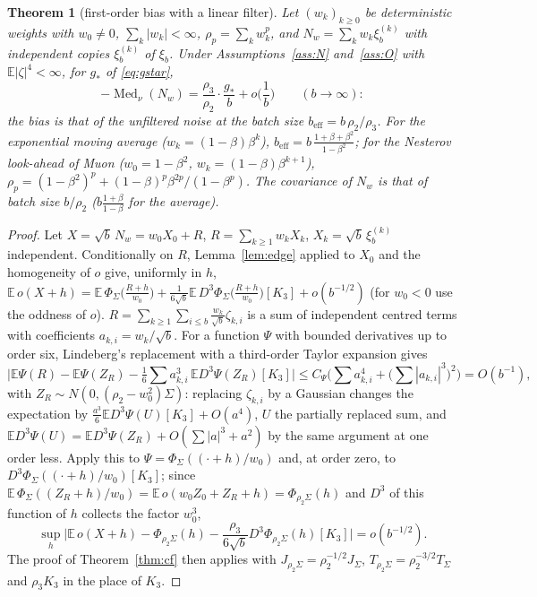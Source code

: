 \documentclass[10pt]{article}
\newtheorem{theorem}{Theorem}
\theoremstyle{definition}
\theoremstyle{remark}
\newcommand{\E}{\mathbb{E}}
\newcommand{\Med}{\operatorname{Med}}
\begin{document}
\begin{theorem}[first-order bias with a linear filter]\label{thm:mombias}
Let $(w_k)_{k\ge0}$ be deterministic weights with $w_0\ne0$, $\sum_k|w_k|<\infty$, $\rho_p=\sum_kw_k^p$, and
$N_w=\sum_kw_k\xi_b^{(k)}$ with independent copies $\xi_b^{(k)}$ of $\xi_b$. Under Assumptions~\ref{ass:N}
and~\ref{ass:O} with $\E|\zeta|^4<\infty$, for $g_\ast$ of \eqref{eq:gstar},
\[
-\Med_\nu(N_w)=\frac{\rho_3}{\rho_2}\cdot\frac{g_\ast}b+o\Big(\frac1b\Big)\qquad(b\to\infty):
\]
the bias is that of the unfiltered noise at the batch size $b_{\mathrm{eff}}=b\,\rho_2/\rho_3$. For the exponential
moving average ($w_k=(1-\beta)\beta^k$), $b_{\mathrm{eff}}=b\,\frac{1+\beta+\beta^2}{1-\beta^2}$; for the Nesterov
look-ahead of Muon ($w_0=1-\beta^2$, $w_k=(1-\beta)\beta^{k+1}$),
$\rho_p=(1-\beta^2)^p+(1-\beta)^p\beta^{2p}/(1-\beta^p)$. The covariance of $N_w$ is that of batch size $b/\rho_2$
($b\frac{1+\beta}{1-\beta}$ for the average).
\end{theorem}
\begin{proof}
Let $X=\sqrt b\,N_w=w_0X_0+R$, $R=\sum_{k\ge1}w_kX_k$, $X_k=\sqrt b\,\xi_b^{(k)}$ independent. Conditionally on $R$,
Lemma~\ref{lem:edge} applied to $X_0$ and the homogeneity of $o$ give, uniformly in $h$,
$\E\,o(X+h)=\E\,\Phi_\Sigma\big(\tfrac{R+h}{w_0}\big)+\frac1{6\sqrt b}\E\,D^3\Phi_\Sigma\big(\tfrac{R+h}{w_0}\big)[K_3]+o(b^{-1/2})$
(for $w_0<0$ use the oddness of $o$). $R=\sum_{k\ge1}\sum_{i\le b}\frac{w_k}{\sqrt b}\zeta_{k,i}$ is a sum of independent
centred terms with coefficients $a_{k,i}=w_k/\sqrt b$. For a function $\Psi$ with bounded derivatives up to order six,
Lindeberg's replacement with a third-order Taylor expansion gives
\[
\Big|\E\Psi(R)-\E\Psi(Z_R)-\tfrac16\textstyle\sum a_{k,i}^3\,\E D^3\Psi(Z_R)[K_3]\Big|\le
C_\Psi\Big(\textstyle\sum a_{k,i}^4+\big(\sum|a_{k,i}|^3\big)^2\Big)=O(b^{-1}),
\]
with $Z_R\sim N(0,(\rho_2-w_0^2)\Sigma)$: replacing $\zeta_{k,i}$ by a Gaussian changes the expectation by
$\frac{a^3}6\E D^3\Psi(U)[K_3]+O(a^4)$, $U$ the partially replaced sum, and $\E D^3\Psi(U)=\E D^3\Psi(Z_R)+O(\sum|a|^3+a^2)$ by
the same argument at one order less. Apply this to $\Psi=\Phi_\Sigma((\cdot+h)/w_0)$ and, at order zero, to
$D^3\Phi_\Sigma((\cdot+h)/w_0)[K_3]$; since $\E\,\Phi_\Sigma((Z_R+h)/w_0)=\E\,o(w_0Z_0+Z_R+h)=\Phi_{\rho_2\Sigma}(h)$ and
$D^3$ of this function of $h$ collects the factor $w_0^3$,
\[
\sup_h\Big|\E\,o(X+h)-\Phi_{\rho_2\Sigma}(h)-\frac{\rho_3}{6\sqrt b}D^3\Phi_{\rho_2\Sigma}(h)[K_3]\Big|=o(b^{-1/2}).
\]
The proof of Theorem~\ref{thm:cf} then applies with $J_{\rho_2\Sigma}=\rho_2^{-1/2}J_\Sigma$,
$T_{\rho_2\Sigma}=\rho_2^{-3/2}T_\Sigma$ and $\rho_3K_3$ in the place of $K_3$.
\end{proof}
\end{document}
